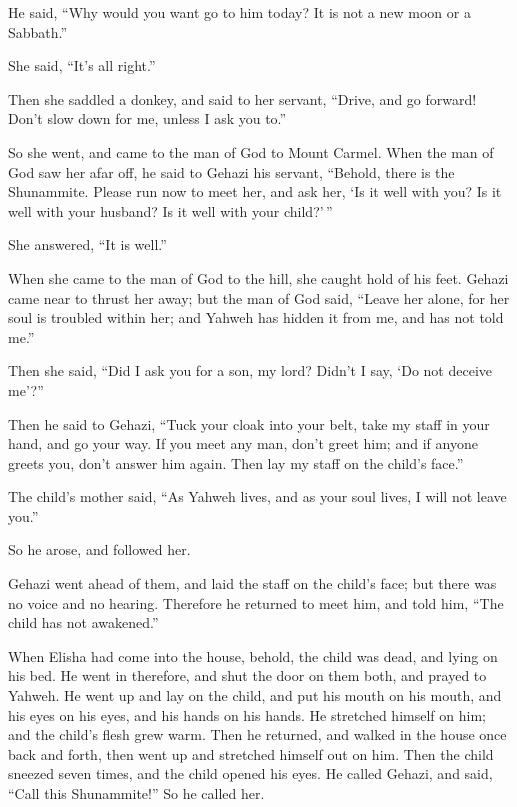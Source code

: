  He said, ``Why would you want go to him today? It is not
a new moon or a Sabbath.''

She said, ``It's all right.''

 Then she saddled a donkey, and said to her servant,
``Drive, and go forward! Don't slow down for me, unless I ask you to.''

 So she went, and came to the man of God to Mount Carmel.
When the man of God saw her afar off, he said to Gehazi his servant,
``Behold, there is the Shunammite.  Please run now to
meet her, and ask her, `Is it well with you? Is it well with your
husband? Is it well with your child?'\,''

She answered, ``It is well.''

 When she came to the man of God to the hill, she caught
hold of his feet. Gehazi came near to thrust her away; but the man of
God said, ``Leave her alone, for her soul is troubled within her; and
Yahweh has hidden it from me, and has not told me.''

 Then she said, ``Did I ask you for a son, my lord?
Didn't I say, `Do not deceive me'?''

 Then he said to Gehazi, ``Tuck your cloak into your
belt, take my staff in your hand, and go your way. If you meet any man,
don't greet him; and if anyone greets you, don't answer him again. Then
lay my staff on the child's face.''

 The child's mother said, ``As Yahweh lives, and as your
soul lives, I will not leave you.''

So he arose, and followed her.

 Gehazi went ahead of them, and laid the staff on the
child's face; but there was no voice and no hearing. Therefore he
returned to meet him, and told him, ``The child has not awakened.''

 When Elisha had come into the house, behold, the child
was dead, and lying on his bed.  He went in therefore,
and shut the door on them both, and prayed to Yahweh.  He
went up and lay on the child, and put his mouth on his mouth, and his
eyes on his eyes, and his hands on his hands. He stretched himself on
him; and the child's flesh grew warm.  Then he returned,
and walked in the house once back and forth, then went up and stretched
himself out on him. Then the child sneezed seven times, and the child
opened his eyes.  He called Gehazi, and said, ``Call this
Shunammite!'' So he called her.

